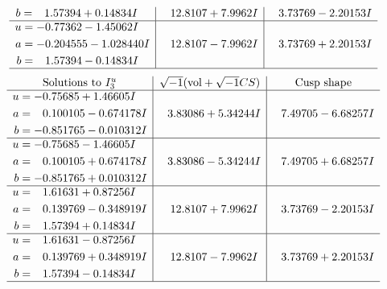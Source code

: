 \documentclass[1p]{elsarticle_modified}
\theoremstyle{definition}
\newcommand{\I}{\sqrt{-1}}
\begin{document}
$$\begin{array}{c|c|c}
\begin{aligned}
b &= \phantom{-}1.57394 + 0.14834 I\end{aligned}
 & \phantom{-}12.8107 + 7.9962 I & \phantom{-}3.73769 - 2.20153 I \\ \hline\begin{aligned}
u &= -0.77362 - 1.45062 I \\
a &= -0.204555 - 1.028440 I \\
b &= \phantom{-}1.57394 - 0.14834 I\end{aligned}
 & \phantom{-}12.8107 - 7.9962 I & \phantom{-}3.73769 + 2.20153 I\\
 \hline 
 \end{array}$$\newpage$$\begin{array}{c|c|c}  
\text{Solutions to }I^u_{3}& \I (\text{vol} + \sqrt{-1}CS) & \text{Cusp shape}\\
 \hline 
\begin{aligned}
u &= -0.75685 + 1.46605 I \\
a &= \phantom{-}0.100105 - 0.674178 I \\
b &= -0.851765 - 0.010312 I\end{aligned}
 & \phantom{-}3.83086 + 5.34244 I & \phantom{-}7.49705 - 6.68257 I \\ \hline\begin{aligned}
u &= -0.75685 - 1.46605 I \\
a &= \phantom{-}0.100105 + 0.674178 I \\
b &= -0.851765 + 0.010312 I\end{aligned}
 & \phantom{-}3.83086 - 5.34244 I & \phantom{-}7.49705 + 6.68257 I \\ \hline\begin{aligned}
u &= \phantom{-}1.61631 + 0.87256 I \\
a &= \phantom{-}0.139769 - 0.348919 I \\
b &= \phantom{-}1.57394 + 0.14834 I\end{aligned}
 & \phantom{-}12.8107 + 7.9962 I & \phantom{-}3.73769 - 2.20153 I \\ \hline\begin{aligned}
u &= \phantom{-}1.61631 - 0.87256 I \\
a &= \phantom{-}0.139769 + 0.348919 I \\
b &= \phantom{-}1.57394 - 0.14834 I\end{aligned}
 & \phantom{-}12.8107 - 7.9962 I & \phantom{-}3.73769 + 2.20153 I\\
 \hline 
 \end{array}$$\newpage\newpage\renewcommand{\arraystretch}{1}
\end{document}
